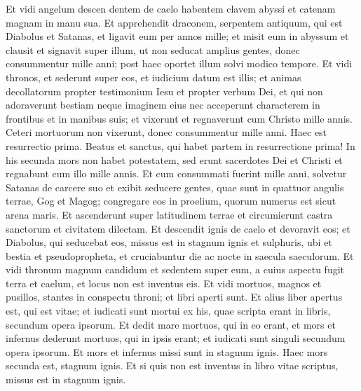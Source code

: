 \begin{biblechapter}  
\verse Et vidi angelum descen dentem de caelo habentem clavem abyssi et catenam magnam in manu sua. 
\verse Et apprehendit draconem, serpentem antiquum, qui est Diabolus et Satanas, et ligavit eum per annos mille; 
\verse et misit eum in abyssum et clausit et signavit super illum, ut non seducat amplius gentes, donec consummentur mille anni; post haec oportet illum solvi modico tempore. 
\verse Et vidi thronos, et sederunt super eos, et iudicium datum est illis; et animas decollatorum propter testimonium Iesu et propter verbum Dei, et qui non adoraverunt bestiam neque imaginem eius nec acceperunt characterem in frontibus et in manibus suis; et vixerunt et regnaverunt cum Christo mille annis. 
\verse Ceteri mortuorum non vixerunt, donec consummentur mille anni. Haec est resurrectio prima. 
\verse Beatus et sanctus, qui habet partem in resurrectione prima! In his secunda mors non habet potestatem, sed erunt sacerdotes Dei et Christi et regnabunt cum illo mille annis. 
\verse Et cum consummati fuerint mille anni, solvetur Satanas de carcere suo 
\verse et exibit seducere gentes, quae sunt in quattuor angulis terrae, Gog et Magog; congregare eos in proelium, quorum numerus est sicut arena maris. 
\verse Et ascenderunt super latitudinem terrae et circumierunt castra sanctorum et civitatem dilectam. Et descendit ignis de caelo et devoravit eos; 
\verse et Diabolus, qui seducebat eos, missus est in stagnum ignis et sulphuris, ubi et bestia et pseudopropheta, et cruciabuntur die ac nocte in saecula saeculorum. 
\verse Et vidi thronum magnum candidum et sedentem super eum, a cuius aspectu fugit terra et caelum, et locus non est inventus eis. 
\verse Et vidi mortuos, magnos et pusillos, stantes in conspectu throni; et libri aperti sunt. Et alius liber apertus est, qui est vitae; et iudicati sunt mortui ex his, quae scripta erant in libris, secundum opera ipsorum. 
\verse Et dedit mare mortuos, qui in eo erant, et mors et infernus dederunt mortuos, qui in ipsis erant; et iudicati sunt singuli secundum opera ipsorum. 
\verse Et mors et infernus missi sunt in stagnum ignis. Haec mors secunda est, stagnum ignis. 
\verse Et si quis non est inventus in libro vitae scriptus, missus est in stagnum ignis. 
\end{biblechapter}

